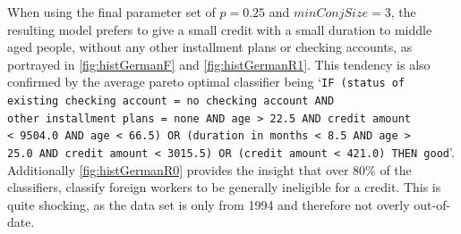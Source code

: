 When using the final parameter set of \(p=0.25\) and \(minConjSize = 3\), the resulting
model prefers to give a small credit with a small duration to middle aged people, without
any other installment plans or checking accounts, as portrayed in \autoref{fig:histGermanF} and \autoref{fig:histGermanR1}.
This tendency is also confirmed by the average pareto optimal classifier being
`\texttt{IF (status of existing checking account = no checking account AND\\other installment plans = none
AND age > 22.5 AND credit amount\\< 9504.0 AND age < 66.5) OR (duration in months < 8.5 AND age >\\25.0 AND credit amount < 3015.5)
OR (credit amount < 421.0) THEN good}'.
Additionally \autoref{fig:histGermanR0} provides the insight that 
over 80\% of the classifiers, classify foreign workers to be generally ineligible for a credit.
This is quite shocking, as the data set is only from 1994 and therefore not overly out-of-date.